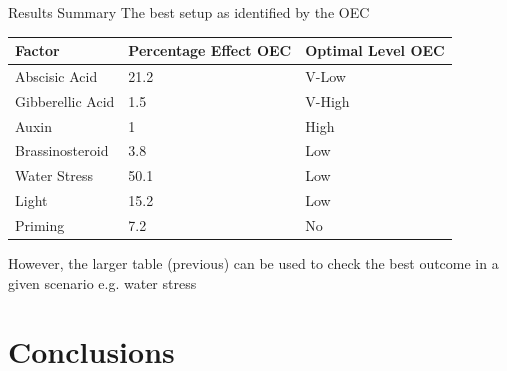 \documentclass[10pt]{beamer}
\begin{document}
\begin{frame}{Results Summary}
	The best setup as identified by the OEC
	\begin{table}[htpb]\small
	\centering
	\begin{tabular}{p{2.7cm} |  p{1.8cm}   p{1.8cm} }
	\hline
	\textbf{Factor}   & \textbf{Percentage Effect OEC}  & \textbf{Optimal Level OEC}\\
	\hline
	Abscisic Acid  &  21.2  &  V-Low\\
	Gibberellic Acid  &  1.5  &  V-High\\	
	Auxin  &  1  &  High\\
	Brassinosteroid  &  3.8  &  Low\\
	Water Stress  &  50.1  &  Low\\	
	Light  &  15.2  &  Low\\
	Priming  &   	7.2	   &  No \\
	\hline
	\end{tabular}
	\end{table}
    \vspace{4mm}
    However, the larger table (previous) can be used to check the best outcome in a given scenario e.g. water stress
\end{frame}



\section{Conclusions}

\end{document}
